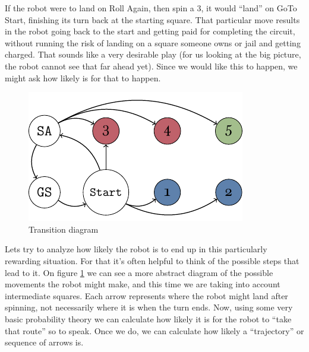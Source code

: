 If the robot were to land on Roll Again, then spin a 3, it 
would ``land'' on GoTo Start, finishing its turn back at the 
starting square. That particular move results in the robot 
going back to the start and getting paid for completing the 
circuit, without running the risk of landing on a square 
someone owns or jail and getting charged. That sounds like a 
very desirable play (for us looking at the big picture, the 
robot cannot see that far ahead yet). Since we would like this 
to happen, we might ask how likely is for that to happen.

\begin{figure}[h]
	\centering
	\includegraphics[width=\textwidth]{img/transicion.pdf}
	\caption{Transition diagram}
	\label{fig:miniopoly-transicion}
\end{figure}

Lets try to analyze how likely the robot is to end up in this 
particularly rewarding situation. For that it's often helpful 
to think of the possible steps that lead to it. On figure 
\ref{fig:miniopoly-transicion} we can see a more abstract 
diagram of the possible movements the robot might make, and 
this time we are taking into account intermediate squares. Each 
arrow represents where the robot might land after spinning, not 
necessarily where it is when the turn ends. Now, using some 
very basic probability theory we can calculate how likely it is 
for the robot to ``take that route'' so to speak. Once we do, 
we can calculate how likely a ``trajectory'' or sequence of 
arrows is.

